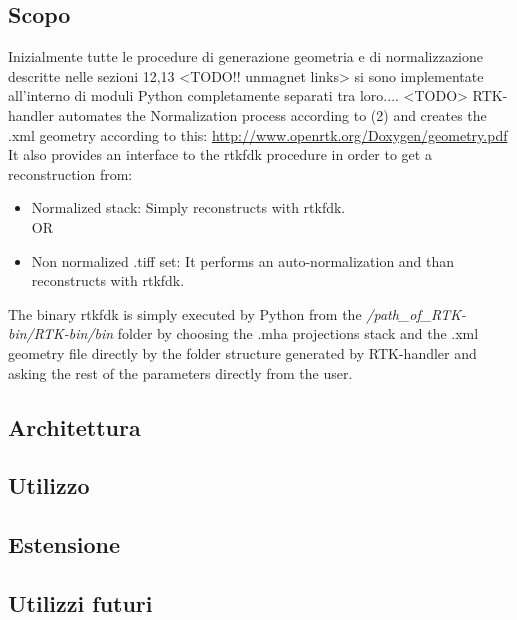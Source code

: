 \documentclass[a4paper,12pt, doubleside]{report}
\begin{document}
            \subsection{Scopo}
                \par 
                    Inizialmente tutte le procedure di generazione geometria e di normalizzazione descritte nelle sezioni 12,13 <TODO!! unmagnet links> si sono implementate all'interno di moduli Python completamente separati tra loro....
                    <TODO>
                    RTK-handler automates the Normalization process according to (2) and creates the .xml geometry according to this:\newline
                    \url{http://www.openrtk.org/Doxygen/geometry.pdf}\newline\newline
                    It also provides an interface to the rtkfdk procedure in order to get a reconstruction from:
                    \begin{itemize}
                    \item Normalized stack:
                    Simply reconstructs with rtkfdk.
                    \newline
                    \\OR
                    \item Non normalized .tiff set:
                        It performs an auto-normalization and than reconstructs with rtkfdk.\newline
                        \end{itemize}
                        The binary rtkfdk is simply executed by Python from the \textit{/path\_of\_RTK-bin/RTK-bin/bin} 
                        folder by choosing the .mha projections stack and the .xml geometry file directly by the folder structure generated by RTK-handler and asking the rest of the parameters directly from the user. 
            \subsection{Architettura}
            \subsection{Utilizzo}
            \subsection{Estensione}
            \subsection{Utilizzi futuri}
            
\end{document}
